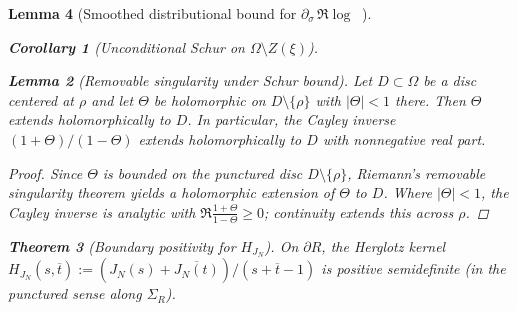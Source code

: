 \documentclass[11pt]{article}
\newtheorem{theorem}{Theorem}
\newtheorem{lemma}[theorem]{Lemma}
\newtheorem{corollary}[theorem]{Corollary}
\theoremstyle{definition}
\theoremstyle{remark}
\DeclareMathOperator{\dettwo}{det_2}
\begin{document}
\begin{lemma}[Smoothed distributional bound for $\partial_\sigma\,\Re\log\dettwo$]
\begin{corollary}[Unconditional Schur on \(\Omega\setminus Z(\xi)\)]
\end{corollary}
\begin{lemma}[Removable singularity under Schur bound]\label{lem:removable-schur}
Let $D\subset\Omega$ be a disc centered at $\rho$ and let $\Theta$ be holomorphic on $D\setminus\{\rho\}$ with $|\Theta|<1$ there. Then $\Theta$ extends holomorphically to $D$. In particular, the Cayley inverse $(1+\Theta)/(1-\Theta)$ extends holomorphically to $D$ with nonnegative real part.
\end{lemma}
\begin{proof}
Since $\Theta$ is bounded on the punctured disc $D\setminus\{\rho\}$, Riemann's removable singularity theorem yields a holomorphic extension of $\Theta$ to $D$. Where $|\Theta|<1$, the Cayley inverse is analytic with $\Re\tfrac{1+\Theta}{1-\Theta}\ge 0$; continuity extends this across $\rho$.
\end{proof}

\begin{theorem}[Boundary positivity for \(H_{J_N}\)]\label{thm:boundary-psd-formal}
On \(\partial R\), the Herglotz kernel \(H_{J_N}(s,\overline t):=(J_N(s)+\overline{J_N(t)})/(s+\overline t-1)\) is positive semidefinite (in the punctured sense along \(\Sigma_R\)).
\end{theorem}


\end{lemma}
\end{document}
